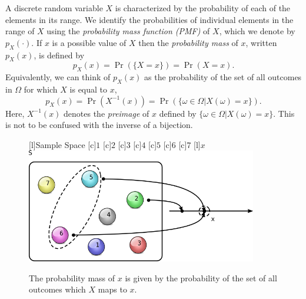 A discrete random variable $X$ is characterized by the probability of each of the elements in its range.
We identify the probabilities of individual elements in the range of $X$ using the \emph{probability mass function (PMF)} of $X$, which we denote by $p_X (\cdot)$. 
If $x$ is a possible value of $X$ then the \emph{probability mass} of $x$, written $p_X (x)$, is defined by
\begin{equation} \label{equation:PMF}
p_X (x) = \Pr ( \{ X = x \} ) = \Pr ( X = x ) .
\end{equation}
Equivalently, we can think of $p_X (x)$ as the probability of the set of all outcomes in $\Omega$ for which $X$ is equal to $x$,
\begin{equation*}
p_X (x)
= \Pr (  X^{-1} (x)  )
= \Pr ( \{ \omega \in \Omega | X(\omega) = x \} ) .
\end{equation*}
Here, $X^{-1} (x)$ denotes the \emph{preimage} of $x$ defined by $\{ \omega \in \Omega | X(\omega) = x \}$. 
This is not to be confused with the inverse of a bijection.

\begin{figure}[ht]
\begin{center}
\begin{psfrags}
[l]{Sample Space}
[c]{$1$}
[c]{$2$}
[c]{$3$}
[c]{$4$}
[c]{$5$}
[c]{$6$}
[c]{$7$}
[l]{$x$}
\includegraphics[height=4.97cm]{Figures/5Chapter/pmf}
\caption{The probability mass of $x$ is given by the probability of the set of all outcomes which $X$ maps to $x$.}
\end{psfrags}
\end{center}
\end{figure}


